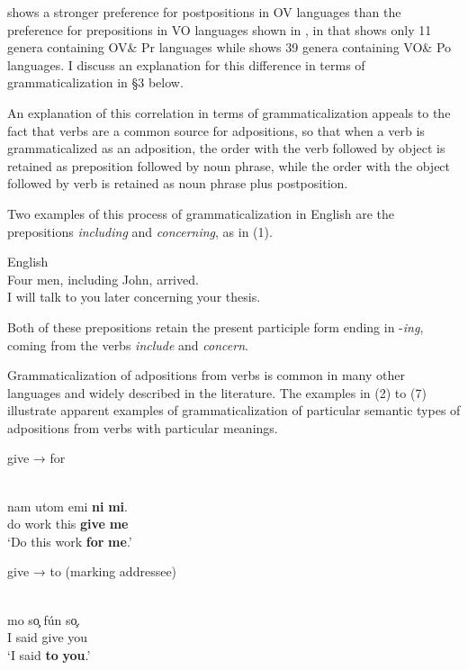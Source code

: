 \documentclass[output=paper]{langsci/langscibook}
\begin{document}
 shows a stronger preference for postpositions in OV languages than the preference for prepositions in VO languages shown in , in that  shows only 11 genera containing OV\& Pr languages while  shows 39 genera containing VO\& Po languages. I discuss an explanation for this difference in terms of grammaticalization in §3 below.

An explanation of this correlation in terms of grammaticalization appeals to the fact that verbs are a common source for adpositions, so that when a verb is grammaticalized as an adposition, the order with the verb followed by object is retained as preposition followed by noun phrase, while the order with the object followed by verb is retained as noun phrase plus postposition.

Two examples of this process of grammaticalization in English are the prepositions \textit{including} and \textit{concerning}, as in (1).

\ea
{English}\\
\ea  Four men, including John, arrived.\\
\ex  I will talk to you later concerning your thesis.\\
\z
\z

Both of these prepositions retain the present participle form ending in -\textit{ing}, coming from the verbs \textit{include} and \textit{concern}. 

Grammaticalization of adpositions from verbs is common in many other languages and widely described in the literature. The examples in (2) to (7) illustrate apparent examples of grammaticalization of particular semantic types of adpositions from verbs with particular meanings.

give → for

\ea\label{ex:dryer:}
\\
\gll   nam  utom  emi  \textbf{ni}  \textbf{mi}.\\
       do  work  this  \textbf{give}  \textbf{me}\\
\glt   ‘Do this work \textbf{for} \textbf{me}.’
\z

give → to (marking addressee)

\ea\label{ex:dryer:}
\\
\gll   mo  so̧  fún  so̧.\\
       I  said  give  you\\
\glt   ‘I said \textbf{to} \textbf{you}.’
\z
\end{document}
